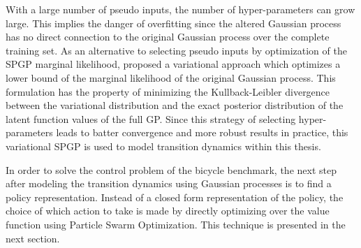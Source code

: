 With a large number of pseudo inputs, the number of hyper-parameters can grow large.
This implies the danger of overfitting since the altered Gaussian process has no direct connection to the original Gaussian process over the complete training set.
As an alternative to selecting pseudo inputs by optimization of the SPGP marginal likelihood, \citeauthor{titsias_variational_2009} proposed a variational approach \cite{titsias_variational_2009} which optimizes a lower bound of the marginal likelihood of the original Gaussian process.
This formulation has the property of minimizing the Kullback-Leibler divergence between the variational distribution and the exact posterior distribution of the latent function values of the full GP.
Since this strategy of selecting hyper-parameters leads to batter convergence and more robust results in practice, this variational SPGP is used to model transition dynamics within this thesis.

In order to solve the control problem of the bicycle benchmark, the next step after modeling the transition dynamics using Gaussian processes is to find a policy representation.
Instead of a closed form representation of the policy, the choice of which action to take is made by directly optimizing over the value function using Particle Swarm Optimization.
This technique is presented in the next section.


